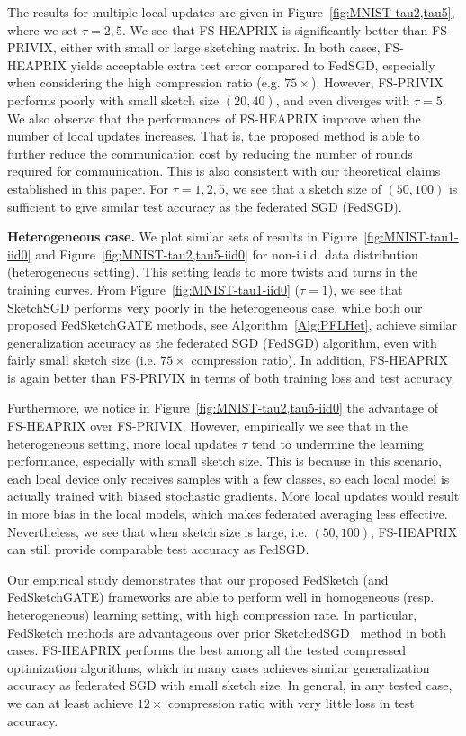 The results for multiple local updates are given in Figure~\ref{fig:MNIST-tau2,tau5}, where we set $\tau=2,5$. We see that FS-HEAPRIX is significantly better than FS-PRIVIX, either with small or large sketching matrix. In both cases, FS-HEAPRIX yields acceptable extra test error compared to FedSGD, especially when considering the high compression ratio (e.g. $75\times$). However, FS-PRIVIX performs poorly with small sketch size $(20,40)$, and even diverges with $\tau=5$. 
We also observe that the performances of FS-HEAPRIX improve when the number of local updates increases. That is, the proposed method is able to further reduce the communication cost by reducing the number of rounds required for communication. This is also consistent with our theoretical claims established in this paper. For $\tau=1,2,5$, we see that a sketch size of $(50,100)$ is sufficient to give similar test accuracy as the federated SGD (FedSGD).

\textbf{Heterogeneous case.} We plot similar sets of results in Figure~\ref{fig:MNIST-tau1-iid0} and Figure~\ref{fig:MNIST-tau2,tau5-iid0} for non-i.i.d. data distribution (heterogeneous setting). This setting leads to more twists and turns in the training curves. 
From Figure~\ref{fig:MNIST-tau1-iid0} ($\tau=1$), we see that SketchSGD performs very poorly in the heterogeneous case, while both our proposed FedSketchGATE methods, see Algorithm~\ref{Alg:PFLHet}, achieve similar generalization accuracy as the federated SGD (FedSGD) algorithm, even with fairly small sketch size (i.e. $75\times$ compression ratio). In addition, FS-HEAPRIX is again better than FS-PRIVIX in terms of both training loss and test accuracy.

Furthermore, we notice in Figure~\ref{fig:MNIST-tau2,tau5-iid0} the advantage of FS-HEAPRIX over FS-PRIVIX. However, empirically we see that in the heterogeneous setting, more local updates $\tau$ tend to undermine the learning performance, especially with small sketch size. This is because in this scenario, each local device only receives samples with a few classes, so each local model is actually trained with biased stochastic gradients. More local updates would result in more bias in the local models, which makes federated averaging less effective. Nevertheless, we see that when sketch size is large, i.e. $(50,100)$, FS-HEAPRIX can still provide comparable test accuracy as FedSGD.

Our empirical study demonstrates that our proposed FedSketch (and FedSketchGATE) frameworks are able to perform well in homogeneous (resp. heterogeneous) learning setting, with high compression rate. In particular, FedSketch methods are advantageous over prior SketchedSGD~\cite{ivkin2019communication} method in both cases. FS-HEAPRIX performs the best among all the tested compressed optimization algorithms, which in many cases achieves similar generalization accuracy as federated SGD with small sketch size. In general, in any tested case, we can at least achieve $12\times$ compression ratio with very little loss in test accuracy.

